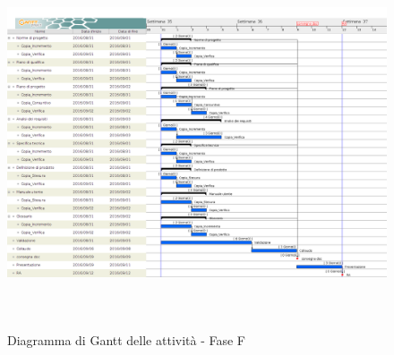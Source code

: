 		\begin{figure}[!h]
			\centering
			\includegraphics[height=11cm, width=15cm]{img/gantt/V} 
			\caption{Diagramma di Gantt delle attività - Fase F}
		\end{figure}
